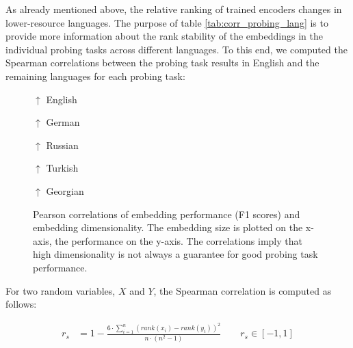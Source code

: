  As already mentioned above, the relative ranking of trained encoders changes in lower-resource languages. The purpose of table \vref{tab:corr_probing_lang} is to provide more information about the rank stability of the embeddings in the individual probing tasks across different languages. To this end, we computed the Spearman correlations between the probing task results in English and the remaining languages for each probing task:



\begin{figure}

\begin{center}
$\uparrow$ English
\end{center}

\begin{center}
$\uparrow$ German
\end{center}

\begin{center}
$\uparrow$ Russian
\end{center}

\begin{center}
$\uparrow$ Turkish
\end{center}

\begin{center}
$\uparrow$ Georgian
\end{center}
\caption[Pearson correlations of embedding performance (F1 scores) and embedding dimensionality]{Pearson correlations of embedding performance (F1 scores) and embedding dimensionality. The embedding size is plotted on the x-axis, the performance on the y-axis. The correlations imply that high dimensionality is not always a guarantee for good probing task performance.}
\label{fig:results_probing_tasks_corr_size}
\end{figure}
\newpage

For two random variables, $X$ and $Y$, the Spearman correlation is computed as follows:

\begin{align}
	r_s &= 1 - \frac{6 \cdot \sum_{i=1}^n (rank(x_i) - rank(y_i))^2}{n \cdot (n^2 - 1)}
				\qquad r_s \in [-1, 1]
\end{align}

